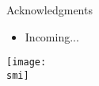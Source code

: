 \documentclass[10pt]{beamer}
\def\smi{out/ln/updir/mw-gcthesis-oral/library.bib}
\begin{document}
    \begin{frame}{Acknowledgments}
      \begin{itemize}
        \item Incoming...
      \end{itemize}
    \end{frame}
    \begin{frame}[plain]
      \def\smi{out/wget/https/imgs.xkcd.com/comics/thesis_defense.png}
      \texttt{[image: \\smi]}%
    \end{frame}

\end{document}
